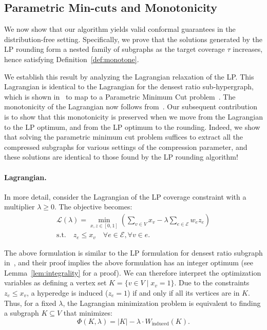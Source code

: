 \subsection{Parametric Min-cuts and Monotonicity} 
\label{sec:mon}
We now show that our algorithm yields valid conformal guarantees in the distribution-free setting. Specifically, we prove that the solutions generated by the LP rounding form a nested family of subgraphs as the target coverage $\tau$ increases, hence satisfying Definition~\ref{def:monotone}. 

We establish this result by analyzing the Lagrangian relaxation of the LP. This Lagrangian is identical to the Lagrangian for the densest ratio sub-hypergraph, which is shown in~\cite{ChekuriQT} to  map to a Parametric Minimum Cut problem~\cite{gallo1989fast}. The monotonicity of the Lagrangian now follows from~\cite{gallo1989fast}. Our subsequent contribution is to show that this monotonicity is preserved when we move from the Lagrangian to the LP optimum, and from the LP optimum to the rounding. Indeed, we show that solving the parametric minimum cut problem suffices to extract all the compressed subgraphs for various settings of the compression parameter, and these solutions are identical to those found by the LP rounding algorithm!

\paragraph{Lagrangian.} In more detail, consider the Lagrangian of the LP coverage constraint with a multiplier $\lambda \ge 0$. The objective becomes:
\begin{align*}
    \label{eq:lagrangian_lp}
    \mathcal{L}(\lambda) = \min_{x, z \in [0,1]} \left( \sum_{v \in V} x_v - \lambda \sum_{e \in \mathcal{E}} w_e z_e \right) \\ 
    \text{s.t.} \quad z_e \le x_v \quad \forall e \in \mathcal{E}, \forall v \in e.
\end{align*}

The above formulation is similar to the LP formulation for densest ratio subgraph in~\cite{charikar2000greedy}, and their proof implies the above formulation has an integer optimum (see Lemma~\ref{lem:integrality} for a proof). We can therefore interpret the optimization variables as defining a vertex set $K = \{v \in V \mid x_v = 1\}$. Due to the constraints $z_e \le x_v$, a hyperedge is induced ($z_e=1$) if and only if all its vertices are in $K$. Thus, for a fixed $\lambda$, the Lagrangian minimization problem is equivalent to finding a subgraph $K \subseteq V$ that minimizes:
\begin{equation}
    \Phi(K, \lambda) = |K| - \lambda \cdot W_{\text{induced}}(K).
\end{equation}

